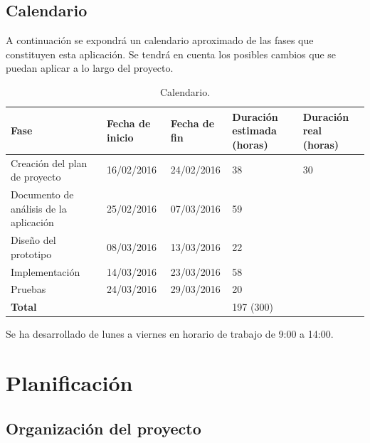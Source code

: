 \documentclass[a4paper,11pt, twoside]{article}
\begin{document}
\subsection{Calendario}
A continuación se expondrá un calendario aproximado de las fases que constituyen esta aplicación. Se tendrá en cuenta los posibles cambios que se puedan aplicar a lo largo del proyecto.
\begin{table}[!htbp]
 \centering
\begin{tabular}{|M{2.65cm}|M{2.65cm}|M{2.65cm}|M{2.65cm}|M{2.65cm}|}
 \hline
 \textbf{\large Fase} & \textbf{\large Fecha de inicio} & \textbf{\large Fecha de fin} & \textbf{\large Duración estimada (horas) } & \textbf{\large Duración real (horas)} \\\hline
    Creación del plan de proyecto & 16/02/2016 & 24/02/2016 & 38 & 30 \\
        \hline
        Documento de análisis de la aplicación & 25/02/2016 & 07/03/2016 & 59 &  \\
        \hline
        Diseño del prototipo & 08/03/2016 & 13/03/2016 & 22 &  \\
        \hline
        Implementación & 14/03/2016 & 23/03/2016 & 58 &  \\
        \hline
        Pruebas & 24/03/2016 & 29/03/2016 & 20 &  \\
        \hline
        \textbf{\large Total} & {\large}  &{\large} & {\large 197 (300) } & {\large} \\
        \hline
\end{tabular}
        \caption{Calendario.}
		\label{ta:cal}
\end{table}

Se ha desarrollado de lunes a viernes en horario de trabajo de 9:00 a 14:00.

\section{Planificación}
\subsection{Organización del proyecto}
\end{document}
